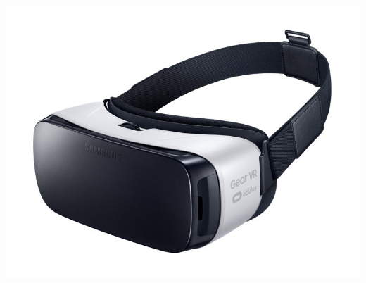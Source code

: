 \documentclass{beamer}
\begin{document}
\begin{frame}
\begin{columns}
    \includegraphics[scale=0.2]{../images/VR.jpeg}
  \end{columns}
\end{frame}
\end{document}
